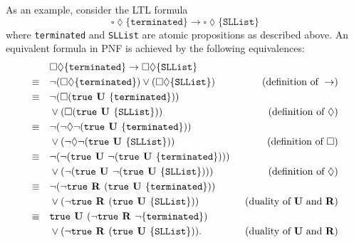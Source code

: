 \documentclass[a4paper, 12pt, twoside]{report}
\begin{document}
	As an example, consider the LTL formula \[\square \lozenge \{\texttt{terminated}\} \rightarrow \square \lozenge \{\texttt{SLList}\}\] where \texttt{terminated} and \texttt{SLList} are atomic propositions as described above. An equivalent formula in PNF is achieved by the following equivalences:
	\begin{align*}
		&\square \lozenge \{\texttt{terminated}\} \rightarrow \square \lozenge \{\texttt{SLList}\} \\
		\equiv \quad &\neg(\square \lozenge \{\texttt{terminated}\}) \vee (\square \lozenge \{\texttt{SLList}\}) \qquad &(\text{definition of } \rightarrow) \\
		\equiv \quad &\neg(\square (\text{\texttt{true}} \text{\textbf{ U }} \{\texttt{terminated}\})) \\&\vee (\square (\text{\texttt{true}} \text{\textbf{ U }} \{\texttt{SLList}\})) \qquad &(\text{definition of } \lozenge) \\
		\equiv \quad &\neg(\neg\lozenge\neg (\text{\texttt{true}} \text{\textbf{ U }} \{\texttt{terminated}\}))\\ &\vee (\neg\lozenge\neg (\text{\texttt{true}} \text{\textbf{ U }} \{\texttt{SLList}\})) \qquad &(\text{definition of } \square) \\
		\equiv \quad &\neg(\neg(\text{\texttt{true}}  \text{\textbf{ U }} \neg (\text{\texttt{true}} \text{\textbf{ U }} \{\texttt{terminated}\})))\\ &\vee (\neg(\text{\texttt{true}} \text{\textbf{ U }} \neg (\text{\texttt{true}} \text{\textbf{ U }} \{\texttt{SLList}\}))) \qquad &(\text{definition of } \lozenge) \\
		\equiv \quad &\neg(\neg\text{\texttt{true}}  \text{\textbf{ R }} (\text{\texttt{true}} \text{\textbf{ U }} \{\texttt{terminated}\}))\\ &\vee (\neg\text{\texttt{true}} \text{\textbf{ R }} (\text{\texttt{true}} \text{\textbf{ U }} \{\texttt{SLList}\})) \qquad &(\text{duality of } \text{\textbf{U}} \text{ and } \text{\textbf{R}}) \\
		\equiv \quad &\text{\texttt{true}}  \text{\textbf{ U }} (\neg\text{\texttt{true}} \text{\textbf{ R }} \neg\{\texttt{terminated}\}) \\&\vee (\neg\text{\texttt{true}} \text{\textbf{ R }} (\text{\texttt{true}} \text{\textbf{ U }} \{\texttt{SLList}\})). \qquad &(\text{duality of } \text{\textbf{U}} \text{  and } \text{\textbf{R}}) \\
	\end{align*}
	
\end{document}
